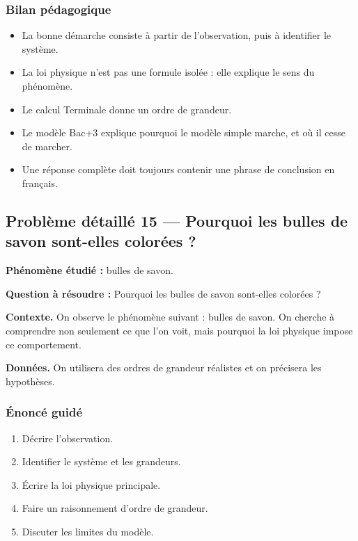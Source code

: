 \documentclass[11pt,a4paper]{article}
\begin{document}
\subsubsection*{Bilan pédagogique}

\begin{methodebox}
\begin{itemize}
  \item La bonne démarche consiste à partir de l'observation, puis à identifier le système.
  \item La loi physique n'est pas une formule isolée : elle explique le sens du phénomène.
  \item Le calcul Terminale donne un ordre de grandeur.
  \item Le modèle Bac+3 explique pourquoi le modèle simple marche, et où il cesse de marcher.
  \item Une réponse complète doit toujours contenir une phrase de conclusion en français.
\end{itemize}
\end{methodebox}

\subsection{Problème détaillé 15 — Pourquoi les bulles de savon sont-elles colorées ?}

\begin{exercicebox}
\textbf{Phénomène étudié :} bulles de savon.

\medskip
\textbf{Question à résoudre :} Pourquoi les bulles de savon sont-elles colorées ?

\medskip
\textbf{Contexte.} On observe le phénomène suivant : bulles de savon. On cherche à comprendre non seulement ce que l'on voit, mais pourquoi la loi physique impose ce comportement.

\medskip
\textbf{Données.} On utilisera des ordres de grandeur réalistes et on précisera les hypothèses.
\end{exercicebox}

\subsubsection*{Énoncé guidé}

\begin{enumerate}
  \item Décrire l'observation.
  \item Identifier le système et les grandeurs.
  \item Écrire la loi physique principale.
  \item Faire un raisonnement d'ordre de grandeur.
  \item Discuter les limites du modèle.
\end{enumerate}
\end{document}

